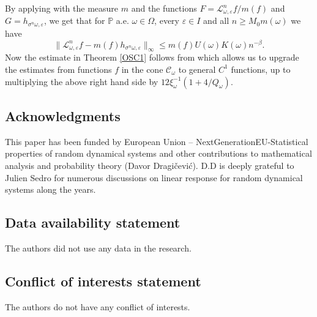 \documentclass[11pt,reqno,a4paper]{article}
\theoremstyle{special}
\def\om{\omega}
\begin{document}
 By applying \cite[Lemma 3.5] {Kifer Thermo} with the measure $m$ and the functions $F=\mathcal L_{\om,\varepsilon}^n f/m(f)$ and $G=h_{\sigma^n\omega,\varepsilon}$, we get that for $\mathbb P$ a.e. $\om \in \Omega$, every $\varepsilon\in I$ and all $n\geq M_0m(\om)$ we have
$$
\|\mathcal L_{\om,\varepsilon}^n f-m(f)h_{\sigma^n\omega,\varepsilon}\|_{\infty}\leq m(f) U(\om)K(\om)n^{-\beta}.
$$
Now the estimate in Theorem \ref{OSC1}   follows from \cite[Lemma 5.4]{YH 23} which allows us to upgrade the estimates from functions $f$ in the cone $\mathcal C_\om$ to general $C^1$ functions, up to multiplying the above right hand side by $12\xi_\om^{-1}(1+4/Q_\om)$. %


\subsection*{Acknowledgments}
 This paper has been funded by European Union – NextGenerationEU-Statistical properties of random dynamical systems and other contributions to mathematical analysis and probability theory (Davor Dragi\v cevi\' c). D.D is deeply grateful to Julien Sedro for numerous discussions on linear response for random dynamical systems along the years.

\subsection*{Data availability statement}
The authors did not use any data in the research.

\subsection*{Conflict of interests statement}
The authors do not have any conflict of interests.
\end{document}
